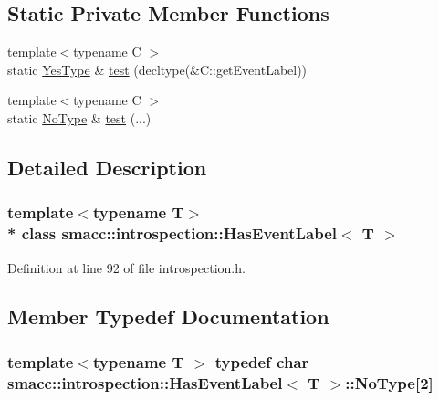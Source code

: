 \subsection*{Static Private Member Functions}
\begin{DoxyCompactItemize}
\item 
{\footnotesize template$<$typename C $>$ }\\static \hyperlink{classsmacc_1_1introspection_1_1HasEventLabel_a8d4b4c2ecb640812e11e8c1407636b6a}{Yes\+Type} \& \hyperlink{classsmacc_1_1introspection_1_1HasEventLabel_ae3239e0c7cf38f2c4f3d3210d5e418a2}{test} (decltype(\&C\+::get\+Event\+Label))
\item 
{\footnotesize template$<$typename C $>$ }\\static \hyperlink{classsmacc_1_1introspection_1_1HasEventLabel_a91b6dd8a7c59c7f24ef0937c99026e81}{No\+Type} \& \hyperlink{classsmacc_1_1introspection_1_1HasEventLabel_a8b29e9cf519f2adf6c0e8634cae63261}{test} (...)
\end{DoxyCompactItemize}


\subsection{Detailed Description}
\subsubsection*{template$<$typename T$>$\\*
class smacc\+::introspection\+::\+Has\+Event\+Label$<$ T $>$}



Definition at line 92 of file introspection.\+h.



\subsection{Member Typedef Documentation}
\subsubsection[{\texorpdfstring{No\+Type}{NoType}}]{\setlength{\rightskip}{0pt plus 5cm}template$<$typename T $>$ typedef char {\bf smacc\+::introspection\+::\+Has\+Event\+Label}$<$ T $>$\+::No\+Type\mbox{[}2\mbox{]}\hspace{0.3cm}{\ttfamily [private]}}\hypertarget{classsmacc_1_1introspection_1_1HasEventLabel_a91b6dd8a7c59c7f24ef0937c99026e81}{}\label{classsmacc_1_1introspection_1_1HasEventLabel_a91b6dd8a7c59c7f24ef0937c99026e81}



